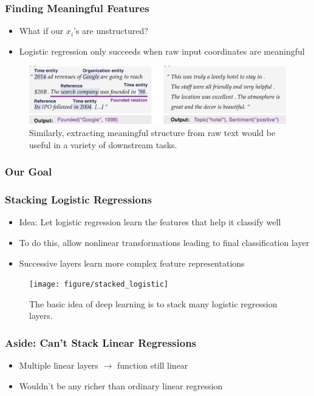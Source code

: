 \documentclass[10pt,mathserif]{beamer}
\begin{document}
\begin{frame}
  \frametitle{Finding Meaningful Features}
 \begin{itemize}
 \item What if our $x_i$'s are unstructured?
 \item Logistic regression only succeeds when raw input coordinates are
   meaningful
 \end{itemize} 
 \begin{figure}[ht]
   \centering
   \includegraphics[width=0.7\paperwidth]{figure/language_features}
   \caption{Similarly, extracting meaningful structure from raw text would be
     useful in a variety of downstream tasks. \label{fig:language_features} }
 \end{figure}
\end{frame}

\begin{frame}
  \frametitle{Our Goal}
\end{frame}

\begin{frame}
  \frametitle{Stacking Logistic Regressions}
  \begin{itemize}
  \item Idea: Let logistic regression learn the features that help it classify
    well
  \item To do this, allow nonlinear transformations leading to final
    classification layer
  \item Successive layers learn more complex feature representations
  \end{itemize}
  \begin{figure}
      \centering
      \texttt{[image: figure/stacked\_logistic]}
      \caption{The basic idea of deep learning is to stack many logistic
        regression layers. \label{fig:stacked_logistic} }
\end{figure}
\end{frame}

\begin{frame}
  \frametitle{Aside: Can't Stack Linear Regressions}
  \begin{itemize}
  \item Multiple linear layers $\rightarrow$ function still linear
  \item Wouldn't be any richer than ordinary linear regression
  \end{itemize} 

\end{frame}
\end{document}
